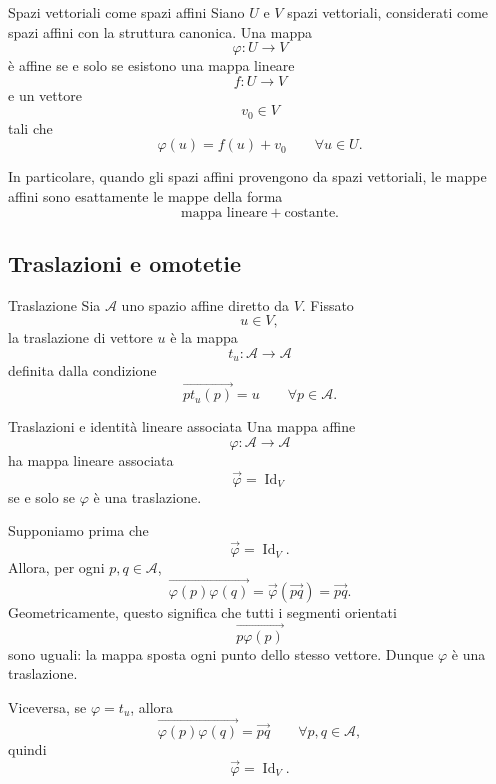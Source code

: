 \documentclass[a4paper]{article}
\begin{document}
\begin{snippetexample}{Spazi vettoriali come spazi affini}
    Siano \(U\) e \(V\) spazi vettoriali, considerati come spazi affini con la struttura canonica. Una mappa
    \[
        \varphi:U\to V
    \]
    è affine se e solo se esistono una mappa lineare
    \[
        f:U\to V
    \]
    e un vettore
    \[
        v_0\in V
    \]
    tali che
    \[
        \varphi(u)=f(u)+v_0
        \qquad
        \forall u\in U.
    \]

    In particolare, quando gli spazi affini provengono da spazi vettoriali, le mappe affini sono esattamente le mappe della forma
    \[
        \text{mappa lineare}+\text{costante}.
    \]
\end{snippetexample}

\subsection{Traslazioni e omotetie}

\begin{snippetdefinition}{Traslazione}
    Sia \(\mathcal{A}\) uno spazio affine diretto da \(V\). Fissato
    \[
        u\in V,
    \]
    la traslazione di vettore \(u\) è la mappa
    \[
        t_u:\mathcal{A}\to\mathcal{A}
    \]
    definita dalla condizione
    \[
        \overrightarrow{pt_u(p)}=u
        \qquad
        \forall p\in\mathcal{A}.
    \]
\end{snippetdefinition}

\begin{snippetproposition}{Traslazioni e identità lineare associata}
    Una mappa affine
    \[
        \varphi:\mathcal{A}\to\mathcal{A}
    \]
    ha mappa lineare associata
    \[
        \overrightarrow{\varphi}=\operatorname{Id}_V
    \]
    se e solo se \(\varphi\) è una traslazione.
\end{snippetproposition}

\begin{snippetproof}{}
    Supponiamo prima che
    \[
        \overrightarrow{\varphi}=\operatorname{Id}_V.
    \]
    Allora, per ogni \(p,q\in\mathcal{A}\),
    \[
        \overrightarrow{\varphi(p)\varphi(q)}
        =
        \overrightarrow{\varphi}(\overrightarrow{pq})
        =
        \overrightarrow{pq}.
    \]
    Geometricamente, questo significa che tutti i segmenti orientati
    \[
        \overrightarrow{p\varphi(p)}
    \]
    sono uguali: la mappa sposta ogni punto dello stesso vettore. Dunque \(\varphi\) è una traslazione.

    Viceversa, se \(\varphi=t_u\), allora
    \[
        \overrightarrow{\varphi(p)\varphi(q)}
        =
        \overrightarrow{pq}
        \qquad
        \forall p,q\in\mathcal{A},
    \]
    quindi
    \[
        \overrightarrow{\varphi}=\operatorname{Id}_V.
    \]
\end{snippetproof}
\end{document}
